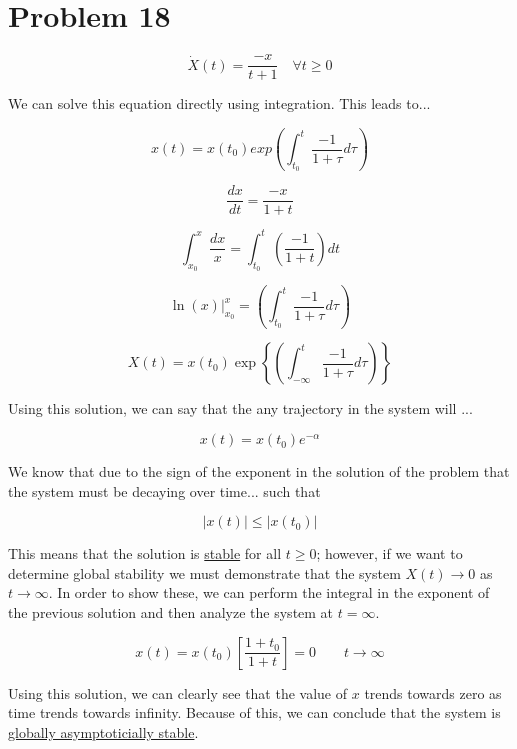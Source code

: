 \section*{Problem 18}



$$
\dot{X}(t) = \frac{-x}{t+1} \quad \forall t \geq 0
$$

\noindent We can solve this equation directly using integration. This leads to...


$$
x(t)  = x(t_0) exp\left( \int_{t_0}^t \frac{-1}{1 + \tau} d\tau \right)
$$



$$
\frac{dx}{dt} = \frac{-x}{1 + t}
$$



$$
\int_{x_{0}}^{x} \frac{d x}{x}=\int_{t_{0}}^{t}\left(\frac{-1}{1+t}\right) d t
$$



$$
\left.\ln (x)\right|_{x_{0}} ^{x}=\left(\int_{t_{0}}^{t} \frac{-1}{1+\tau} d \tau\right)
$$


$$
X(t)=x\left(t_{0}\right) \exp \left\{\left(\int_{-\infty}^{t} \frac{-1}{1+\tau} d \tau\right)\right\}
$$



\noindent Using this solution, we can say that the any trajectory in the system will ...


$$
x(t) = x(t_0)e^{-\alpha}
$$

\noindent We know that due to the sign of the exponent in the solution of the problem that the system must be decaying over time... such that


$$
|x(t)| \leq |x(t_0)|
$$

\noindent This means that the solution is \underline{stable} for all $t \geq 0$; however, if we want to determine global stability we must demonstrate that the system $X(t) \rightarrow 0$ as $t \rightarrow \infty $. In order to show these, we can perform the integral in the exponent of the previous solution and then analyze the system at $t=\infty$.

$$
x(t) = x(t_0)\left[\frac{1+ t_0}{1 + t} \right] = 0 \quad \quad t \rightarrow \infty
$$


\noindent Using this solution, we can clearly see that the value of $x$ trends towards zero as time trends towards infinity. Because of this, we can conclude that the system is \underline{globally asymptoticially stable}.
